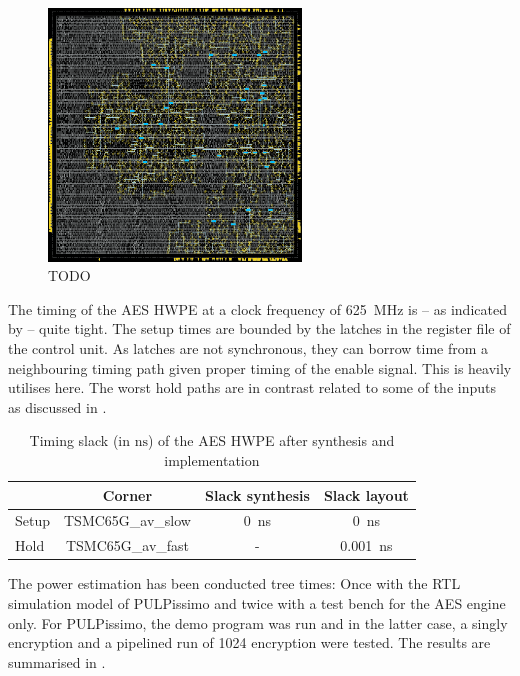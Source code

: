 \documentclass[a4paper, 12pt]{article}
\begin{document}
\begin{figure} [h!]
	\centering
	\includegraphics[width=0.6\textwidth]{clock_tree.png}
	\caption{TODO}
	\label{fig:clock-tree}
\end{figure}

The timing of the AES HWPE at a clock frequency of \SI{625}{MHz} is -- as indicated by  -- quite tight. The setup times are bounded by the latches in the register file of the control unit. As latches are not synchronous, they can borrow time from a neighbouring timing path given proper timing of the enable signal. This is heavily utilises here. The worst hold paths are in contrast related to some of the inputs as discussed in .

\begin{table}[h]
    \centering
    \begin{tabular}{l|c c c}
        \toprule
         & Corner &  Slack synthesis & Slack layout \\
        \midrule
		Setup & TSMC65G\_av\_slow & \SI{0}{ns} & \SI{0}{ns} \\ 
		Hold & TSMC65G\_av\_fast & - & \SI{0.001}{ns} \\ 
        \bottomrule
    \end{tabular}
	\caption{Timing slack (in $\textrm{ns}$) of the AES HWPE after synthesis and implementation}
	\label{tab:results-timing}
\end{table}

The power estimation has been conducted tree times: Once with the RTL simulation model of PULPissimo and twice with a test bench for the AES engine only. For PULPissimo, the demo program was run and in the latter case, a singly encryption and a pipelined run of 1024 encryption were tested. The results are summarised in .
\end{document}
